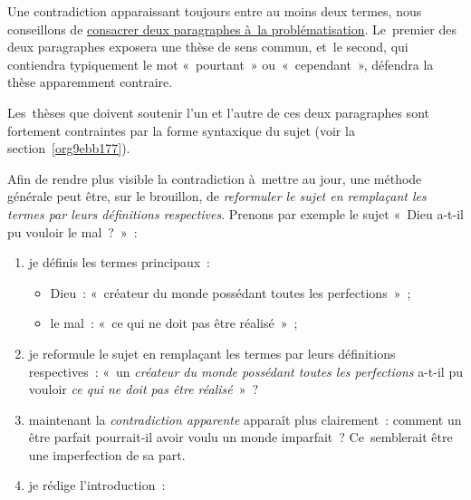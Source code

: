 \documentclass[a4paper,12pt]{report}
\begin{document}
Une contradiction apparaissant toujours entre au moins deux termes, nous
conseillons de \uline{consacrer deux paragraphes à la problématisation}.
Le premier des deux paragraphes exposera une thèse de sens commun, et le
second, qui contiendra typiquement le mot « pourtant » ou « cependant »,
défendra la thèse apparemment contraire.

Les thèses que doivent soutenir l'un et l'autre de ces deux paragraphes
sont fortement contraintes par la forme syntaxique du sujet (voir la
section \ref{org9ebb177}).

Afin de rendre plus visible la contradiction à mettre au jour, une
méthode générale peut être, sur le brouillon, de \emph{reformuler le sujet en
remplaçant les termes par leurs définitions respectives}. Prenons par
exemple le sujet « Dieu a-t-il pu vouloir le mal ? » :

\begin{enumerate}
\item je définis les termes principaux :
\begin{itemize}
\item Dieu : « créateur du monde possédant toutes les perfections » ;
\item le mal : « ce qui ne doit pas être réalisé » ;
\end{itemize}

\item je reformule le sujet en remplaçant les termes par leurs définitions
respectives : « un \emph{créateur du monde possédant toutes les
perfections} a-t-il pu vouloir \emph{ce qui ne doit pas être réalisé} » ?

\item maintenant la \emph{contradiction apparente} apparaît plus clairement :
comment un être parfait pourrait-il avoir voulu un monde imparfait ?
Ce semblerait être une imperfection de sa part.

\item je rédige l'introduction :
\end{enumerate}
\end{document}
